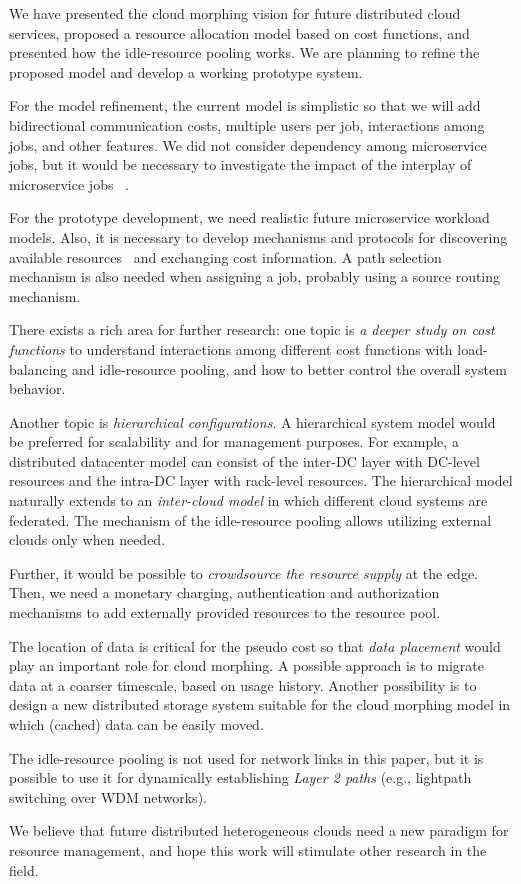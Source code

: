 
We have presented the cloud morphing vision for future distributed
cloud services,
proposed a resource allocation model based on cost functions,
and presented how the idle-resource pooling works.
We are planning to refine the proposed model and develop a working
prototype system.

For the model refinement,
the current model is simplistic so that we will add bidirectional
communication costs,
multiple users per job, interactions among jobs, and other features.
We did not consider dependency among microservice jobs, but it would be
necessary to investigate the impact of the interplay of microservice
jobs ~\cite{Suresh-SOA-SOCC2017}.

For the prototype development,
we need realistic future microservice workload models.
Also, it is necessary to develop mechanisms and protocols for
discovering available resources~\cite{Albrecht2008} and exchanging
cost information.
A path selection mechanism is also needed when assigning a job,
probably using a source routing mechanism.

There exists a rich area for further research:
one topic is {\em a deeper study on cost functions}
to understand interactions among different cost functions
with load-balancing and idle-resource pooling,
and how to better control the overall system behavior.

Another topic is {\em hierarchical configurations}.
A hierarchical system model would be preferred for scalability
and for management purposes.
For example, a distributed datacenter model can consist of
the inter-DC layer with DC-level resources and the intra-DC layer
with rack-level resources.
The hierarchical model naturally extends to
an {\em inter-cloud model} in which different cloud systems are
federated.
The mechanism of the idle-resource pooling allows utilizing external
clouds only when needed.

Further, it would be possible to {\em crowdsource the resource supply}
at the edge. 
Then, we need a monetary charging, authentication and authorization
mechanisms to add externally provided resources to the resource pool.

The location of data is critical for the pseudo cost so that
{\em data placement} would play an important role for cloud morphing. 
A possible approach is to migrate data at a coarser timescale, based
on usage history.
Another possibility is to design a new distributed storage system
suitable for the cloud morphing model in which (cached) data can be
easily moved.

The idle-resource pooling is not used for network links in this paper, but
it is possible to use it for dynamically establishing {\em Layer 2 paths}
(e.g., lightpath switching over WDM networks).

We believe that future distributed heterogeneous clouds need a new
paradigm for resource management, and hope this work will stimulate
other research in the field.

